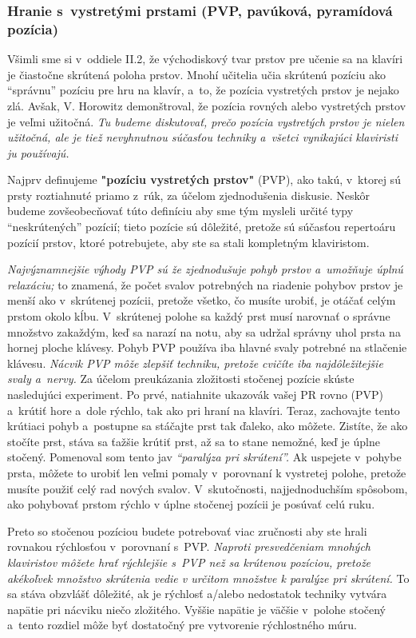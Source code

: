 \subsubsection{Hranie s~vystretými prstami (PVP, pavúková, pyramídová pozícia)}
Všimli sme si v~oddiele II.2, že východiskový tvar prstov pre učenie sa na klavíri je čiastočne skrútená poloha prstov. Mnohí učitelia učia skrútenú pozíciu ako “správnu” pozíciu pre hru na klavír, a~to, že pozícia vystretých prstov je nejako zlá. Avšak, V. Horowitz demonštroval, že pozícia rovných alebo vystretých prstov je veľmi užitočná. \emph{Tu budeme diskutovať, prečo pozícia vystretých prstov je nielen užitočná, ale je tiež nevyhnutnou súčasťou techniky a~všetci vynikajúci klaviristi ju používajú.} 

Najprv definujeme \textbf{"pozíciu vystretých prstov"} (PVP), ako takú, v~ktorej sú prsty roztiahnuté priamo z~rúk, za účelom zjednodušenia diskusie. Neskôr budeme zovšeobecňovať túto definíciu aby sme tým mysleli určité typy “neskrútených” pozícií; tieto pozície sú dôležité, pretože sú súčasťou repertoáru pozícií prstov, ktoré potrebujete, aby ste sa stali kompletným klaviristom. 

\emph{Najvýznamnejšie výhody PVP sú že zjednodušuje pohyb prstov a~umožňuje úplnú relaxáciu;} to znamená, že počet svalov potrebných na riadenie pohybov prstov je menší ako v~skrútenej pozícii, pretože všetko, čo musíte urobiť, je otáčať celým prstom okolo kĺbu. V~skrútenej polohe sa každý prst musí narovnať o správne množstvo zakaždým, keď sa narazí na notu, aby sa udržal správny uhol prsta na hornej ploche klávesy. Pohyb PVP používa iba hlavné svaly potrebné na stlačenie klávesu. \emph{Nácvik PVP môže zlepšiť techniku, pretože cvičíte iba najdôležitejšie svaly a~nervy.} Za účelom preukázania zložitosti stočenej pozície skúste nasledujúci experiment. Po prvé, natiahnite ukazovák vašej PR rovno (PVP) a~krútiť hore a~dole rýchlo, tak ako pri hraní na klavíri. Teraz, zachovajte tento krútiaci pohyb a~postupne sa stáčajte prst tak ďaleko, ako môžete. Zistíte, že ako stočíte prst, stáva sa ťažšie krútiť prst, až sa to stane nemožné, keď je úplne stočený. Pomenoval som tento jav \emph{“paralýza pri skrútení”.} Ak uspejete v~pohybe prsta, môžete to urobiť len veľmi pomaly v~porovnaní k vystretej polohe, pretože musíte použiť celý rad nových svalov. V~skutočnosti, najjednoduchším spôsobom, ako pohybovať prstom rýchlo v úplne stočenej pozícii je posúvať celú ruku. 

Preto so stočenou pozíciou budete potrebovať viac zručnosti aby ste hrali rovnakou rýchlosťou v~porovnaní s~PVP. \emph{Naproti presvedčeniam mnohých klaviristov môžete hrať rýchlejšie s~PVP než sa krútenou pozíciou, pretože akékoľvek množstvo skrútenia vedie v určitom množstve k paralýze pri skrútení.} To sa stáva obzvlášť dôležité, ak je rýchlosť a/alebo nedostatok techniky vytvára napätie pri nácviku niečo zložitého. Vyššie napätie je väčšie v~polohe stočený a~tento rozdiel môže byť dostatočný pre vytvorenie rýchlostného múru. 


